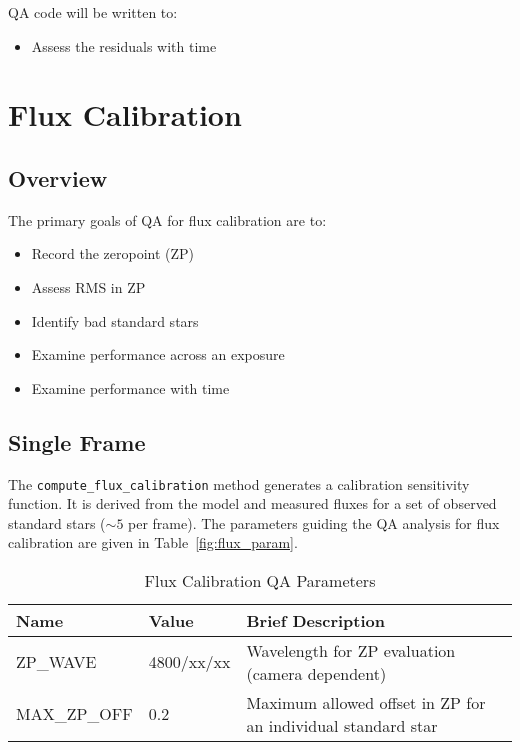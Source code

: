 \documentclass[12pt]{article}
\newenvironment{myitemize}
{ \begin{itemize}
    \setlength{\itemsep}{0pt}
    \setlength{\parskip}{0pt}
    \setlength{\parsep}{0pt}     }
{ \end{itemize}                  }
\begin{document}
QA code will be written to:

\begin{myitemize}
\item Assess the residuals with time
\end{myitemize}

\section{Flux Calibration}

\subsection{Overview}

The primary goals of QA for flux calibration are to:

\begin{myitemize}
\item Record the zeropoint (ZP) 
\item Assess RMS in ZP
\item Identify bad standard stars
\item Examine performance across an exposure
\item Examine performance with time
\end{myitemize}

\subsection{Single Frame}

The {\tt compute\_flux\_calibration} method generates
a calibration sensitivity function.  It is derived
from the model and measured fluxes for
a set of observed standard stars ($\sim 5$ per frame).
The parameters guiding the QA analysis for flux
calibration are given in Table~\ref{fig:flux_param}.

\begin{table}[h]
\begin{center}
\caption{Flux Calibration QA Parameters}
\label{tab:flux_param}
\begin{tabular}{p{3.5cm}p{1.2cm}p{8.3cm}}
\hline
{\bf Name} & {\bf Value} & {\bf Brief Description}\\
\hline
ZP\_WAVE       & 4800/xx/xx & Wavelength for ZP evaluation (camera dependent) \\
MAX\_ZP\_OFF   & 0.2        & Maximum allowed offset in ZP for an individual standard star \\
\hline
\end{tabular}
\end{center}
\end{table}
\end{document}
